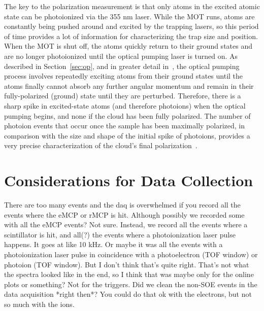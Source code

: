 The key to the polarization measurement is that only atoms in the excited atomic state can be photoionized via the 355 nm laser.  While the MOT runs, atoms are constantly being pushed around and excited by the trapping lasers, so this period of time provides a lot of information for characterizing the trap size and position.  When the MOT is shut off, the atoms quickly return to their ground states and are no longer photoionized until the optical pumping laser is turned on.  As described in Section~\ref{sec:op}, and in greater detail in~\cite{ben_OP}, the optical pumping process involves repeatedly exciting atoms from their ground states until the atoms finally cannot absorb any further angular momentum and remain in their fully-polarized (ground) state until they are perturbed.  Therefore, there is a sharp spike in excited-state atoms (and therefore photoions) when the optical pumping begins, and none if 
the cloud has been fully polarized.  The number of photoion events that occur once the sample has been maximally polarized, in comparison with the size and shape of the initial spike of photoions, provides a very precise characterization of the cloud's final polarization~\cite{ben_OP}.


\section{Considerations for Data Collection}
\label{sec:dataconsiderations}
There are too many events and the daq is overwhelmed if you record all the events where the eMCP or rMCP is hit.  Although possibly we recorded some with all the eMCP events?  Not sure.
Instead, we record all the events where a scintillator is hit, and all(?) the events where a photoionization laser pulse happens.  It goes at like 10 kHz.  Or maybe it was all the events with a photoionization laser pulse in coincidence with a photoelectron (TOF window) or photoion (TOF window).  But I don't think that's quite right.  That's not what the spectra looked like in the end, so I think that was maybe only for the online plots or something?  Not for the triggers.  Did we clean the non-SOE events in the data acquisition *right then*?  You could do that ok with the electrons, but not so much with the ions.  
\note[tag]{}

